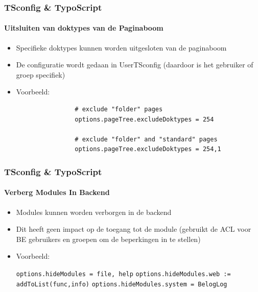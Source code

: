 
\begin{frame}[fragile]
	\frametitle{TSconfig \& TypoScript}
	\framesubtitle{Uitsluiten van doktypes van de Paginaboom}

	\begin{itemize}

		\item Specifieke doktypes kunnen worden uitgesloten van de paginaboom
		\item De configuratie wordt gedaan in UserTSconfig (daardoor is het gebruiker of groep specifiek)
		\item Voorbeeld:

			\begin{lstlisting}
				# exclude "folder" pages
				options.pageTree.excludeDoktypes = 254

				# exclude "folder" and "standard" pages
				options.pageTree.excludeDoktypes = 254,1
			\end{lstlisting}

	\end{itemize}

\end{frame}


\begin{frame}[fragile]
	\frametitle{TSconfig \& TypoScript}
	\framesubtitle{Verberg Modules In Backend}

	\begin{itemize}

		\item Modules kunnen worden verborgen in de backend
		\item Dit heeft geen impact op de toegang tot de module\newline
			(gebruikt de ACL voor BE gebruikers en groepen om de beperkingen in te stellen)
		\item Voorbeeld:

			\lstinline!options.hideModules = file, help!
			\lstinline!options.hideModules.web := addToList(func,info)!
			\lstinline!options.hideModules.system = BelogLog!

	\end{itemize}

\end{frame}

